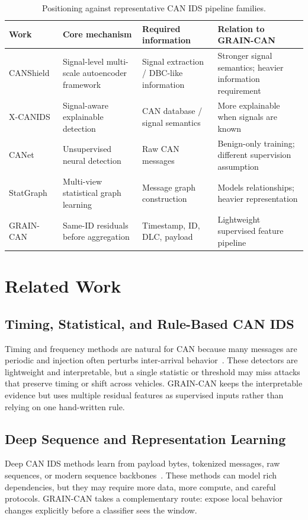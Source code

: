 \documentclass[runningheads]{llncs}
\newcommand{\method}{GRAIN-CAN}
\begin{document}
\begin{table}[t]
\caption{Positioning against representative CAN IDS pipeline families.}
\label{tab:positioning}
\centering\small
\setlength{\tabcolsep}{3pt}
\begin{tabular}{p{}p{}p{}p{}}
\toprule
Work & Core mechanism & Required information & Relation to \method{} \\
\midrule
CANShield~\cite{shahriar2022} & Signal-level multi-scale autoencoder framework & Signal extraction / DBC-like information & Stronger signal semantics; heavier information requirement \\
X-CANIDS~\cite{xcanids2023} & Signal-aware explainable detection & CAN database / signal semantics & More explainable when signals are known \\
CANet~\cite{canet2019} & Unsupervised neural detection & Raw CAN messages & Benign-only training; different supervision assumption \\
StatGraph~\cite{wang2023} & Multi-view statistical graph learning & Message graph construction & Models relationships; heavier representation \\
\method{} & Same-ID residuals before aggregation & Timestamp, ID, DLC, payload & Lightweight supervised feature pipeline \\
\bottomrule
\end{tabular}
\end{table}

\section{Related Work}
\subsection{Timing, Statistical, and Rule-Based CAN IDS}
Timing and frequency methods are natural for CAN because many messages are periodic and injection often perturbs inter-arrival behavior~\cite{song2016,taylor2015,blevins2021}. These detectors are lightweight and interpretable, but a single statistic or threshold may miss attacks that preserve timing or shift across vehicles. \method{} keeps the interpretable evidence but uses multiple residual features as supervised inputs rather than relying on one hand-written rule.

\subsection{Deep Sequence and Representation Learning}
Deep CAN IDS methods learn from payload bytes, tokenized messages, raw sequences, or modern sequence backbones~\cite{alkhatib2022,liu2026}. These methods can model rich dependencies, but they may require more data, more compute, and careful protocols. \method{} takes a complementary route: expose local behavior changes explicitly before a classifier sees the window.
\end{document}
